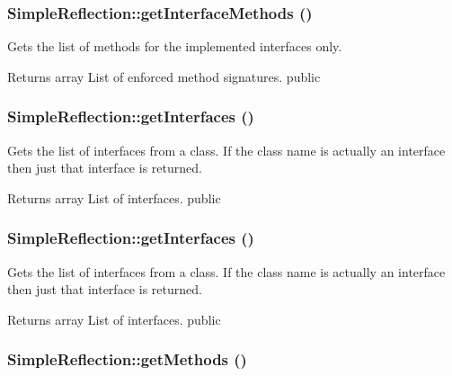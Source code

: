 \hypertarget{class_simple_reflection_aacb55dfc402458422e376227aa54dd91}{
\subsubsection[{getInterfaceMethods}]{\setlength{\rightskip}{0pt plus 5cm}SimpleReflection::getInterfaceMethods ()}}
\label{class_simple_reflection_aacb55dfc402458422e376227aa54dd91}
Gets the list of methods for the implemented interfaces only. \begin{DoxyReturn}{Returns}
array List of enforced method signatures.  public 
\end{DoxyReturn}
\hypertarget{class_simple_reflection_a6ed9bfcb7b8dd94903537d783c536f17}{
\subsubsection[{getInterfaces}]{\setlength{\rightskip}{0pt plus 5cm}SimpleReflection::getInterfaces ()}}
\label{class_simple_reflection_a6ed9bfcb7b8dd94903537d783c536f17}
Gets the list of interfaces from a class. If the class name is actually an interface then just that interface is returned. \begin{DoxyReturn}{Returns}
array List of interfaces.  public 
\end{DoxyReturn}
\hypertarget{class_simple_reflection_a6ed9bfcb7b8dd94903537d783c536f17}{
\subsubsection[{getInterfaces}]{\setlength{\rightskip}{0pt plus 5cm}SimpleReflection::getInterfaces ()}}
\label{class_simple_reflection_a6ed9bfcb7b8dd94903537d783c536f17}
Gets the list of interfaces from a class. If the class name is actually an interface then just that interface is returned. \begin{DoxyReturn}{Returns}
array List of interfaces.  public 
\end{DoxyReturn}
\hypertarget{class_simple_reflection_af595c3f6cffaa3c4c7d6993a65e59206}{
\subsubsection[{getMethods}]{\setlength{\rightskip}{0pt plus 5cm}SimpleReflection::getMethods ()}}
